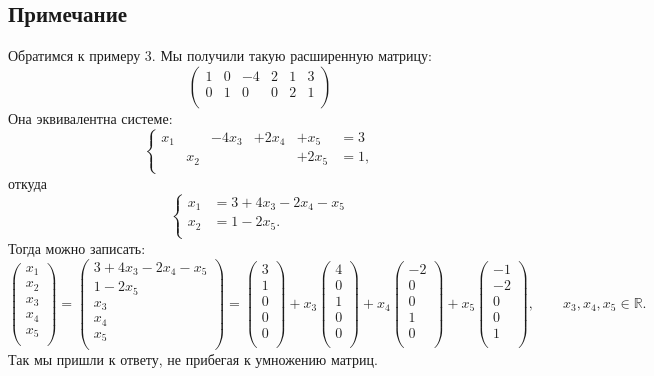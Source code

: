 \subsection{Примечание}
Обратимся к примеру 3. Мы получили такую расширенную матрицу:
$$
\left( \begin{array}{ccccc|c}
1 & 0 & -4 & 2 & 1 & 3\\
0 & 1 & 0 & 0 & 2 & 1\\
\end{array} \right)
$$
Она эквивалентна системе:
$$
\left\{
\begin{array}{rrrrrrl}
x_1&&-4x_3&+2x_4&+x_5&=3\\
&x_2&&&+2x_5&=1,\\
\end{array}
\right.
$$
откуда
$$
\left\{
\begin{array}{rl}
x_1&=3+4x_3-2x_4-x_5\\
x_2&=1-2x_5.\\
\end{array}
\right.
$$
Тогда можно записать:
$$
\begin{pmatrix}
x_1\\
x_2\\
x_3\\
x_4\\
x_5\\
\end{pmatrix}
=
\begin{pmatrix}
3+4x_3-2x_4-x_5\\
1-2x_5\\
x_3\\
x_4\\
x_5\\
\end{pmatrix}
=
\begin{pmatrix}
3\\
1\\
0\\
0\\
0\\
\end{pmatrix}
+x_3
\begin{pmatrix}
4\\
0\\
1\\
0\\
0\\
\end{pmatrix}
+x_4
\begin{pmatrix}
-2\\
0\\
0\\
1\\
0\\
\end{pmatrix}
+x_5
\begin{pmatrix}
-1\\
-2\\
0\\
0\\
1\\
\end{pmatrix}
,\qquad x_3, x_4, x_5 \in \mathbb{R}.
$$
Так мы пришли к ответу, не прибегая к умножению матриц.